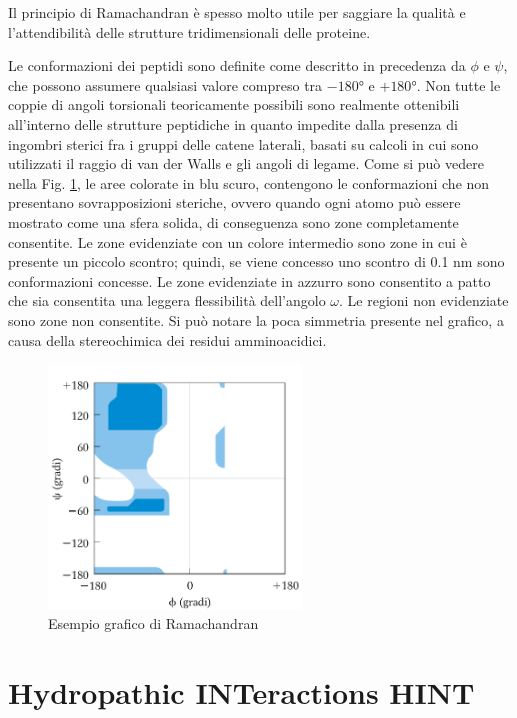 Il principio di Ramachandran è spesso molto utile per saggiare la qualità e l'attendibilità delle strutture tridimensionali delle proteine. 

Le conformazioni dei peptidi sono definite come descritto in precedenza da $\phi$ e $\psi$, che possono assumere qualsiasi valore compreso tra $-180°$ e $+180°$. Non tutte le coppie di angoli torsionali teoricamente possibili sono realmente ottenibili all'interno delle strutture peptidiche in quanto impedite dalla presenza di ingombri sterici fra i gruppi delle catene laterali, basati su calcoli in cui sono utilizzati il raggio di van der Walls e gli angoli di legame. Come si può vedere nella Fig. \ref{fig:graficoRamachandran}, le aree colorate in blu scuro, contengono le conformazioni che non presentano sovrapposizioni steriche, ovvero quando ogni atomo può essere mostrato come una sfera solida, di conseguenza sono zone completamente consentite. Le zone evidenziate con un colore intermedio sono zone in cui è presente un piccolo scontro; quindi, se viene concesso uno scontro di 0.1 nm sono conformazioni concesse. Le zone evidenziate in azzurro sono consentito a patto che sia consentita una leggera flessibilità dell'angolo $\omega$. Le regioni non evidenziate sono zone non consentite. Si può notare la poca simmetria presente nel grafico, a causa della stereochimica dei residui amminoacidici.
\begin{figure}
	\centering
	\includegraphics[width=0.6\textwidth]{Immagini/GraficoRamachandran.png}
	\caption{Esempio grafico di Ramachandran}
	\label{fig:graficoRamachandran}
\end{figure}

\section{Hydropathic INTeractions HINT}\label{sec:cap_sec_subsec}

